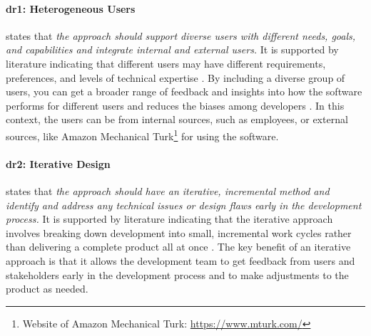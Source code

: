 
\paragraph{\ac{dr}1: Heterogeneous Users} states that \textit{the approach should support diverse users with different needs, goals, and capabilities and integrate internal and external users.} 
It is supported by literature indicating that different users may have different requirements, preferences, and levels of technical expertise \cite{misc:lean:steve}.
By including a diverse group of users, you can get a broader range of feedback and insights into how the software performs for different users \cite{article:prototyping:weichbroth} and reduces the biases among developers \cite{misc:lean:burmeister}.
In this context, the users can be from internal sources, such as employees, or external sources, like Amazon Mechanical Turk\footnote{Website of Amazon Mechanical Turk: \url{https://www.mturk.com/}} for using the software.

\paragraph{\ac{dr}2: Iterative Design} states that \textit{the approach should have an iterative, incremental method and identify and address any technical issues or design flaws early in the development process.} 
It is supported by literature indicating that the iterative approach involves breaking down development into small, incremental work cycles rather than delivering a complete product all at once \cite{misc:lean:tutorial}.
The key benefit of an iterative approach is that it allows the development team to get feedback from users and stakeholders early in the development process and to make adjustments \cite{article:experiments:lindgren} to the product as needed.

